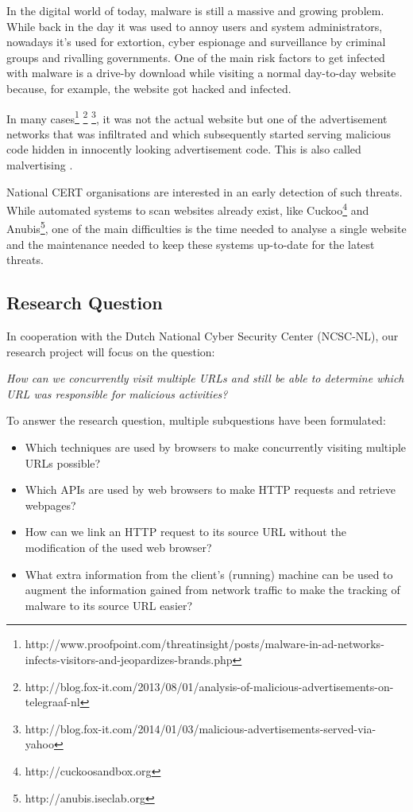 
In the digital world of today, malware is still a massive and growing problem. While back in the day it was used to annoy users and system administrators, nowadays it's used for extortion, cyber espionage and surveillance by criminal groups and rivalling governments. One of the main risk factors to get infected with malware is a drive-by download while visiting a normal day-to-day website because, for example, the website got hacked and infected. 

In many cases\footnote{http://www.proofpoint.com/threatinsight/posts/malware-in-ad-networks-infects-visitors-and-jeopardizes-brands.php} \footnote{http://blog.fox-it.com/2013/08/01/analysis-of-malicious-advertisements-on-telegraaf-nl} \footnote{http://blog.fox-it.com/2014/01/03/malicious-advertisements-served-via-yahoo}, it was not the actual website but one of the advertisement networks that was infiltrated and which subsequently started serving malicious code hidden in innocently looking advertisement code. This is also called malvertising \cite{Li2012}.

National CERT organisations are interested in an early detection of such threats. While automated systems to scan websites already exist, like Cuckoo\footnote{http://cuckoosandbox.org} and Anubis\footnote{http://anubis.iseclab.org}, one of the main difficulties is the time needed to analyse a single website and the maintenance needed to keep these systems up-to-date for the latest threats.



\subsection{Research Question}

In cooperation with the Dutch National Cyber Security Center (NCSC-NL), our research project will focus on the question:

\textit{How can we concurrently visit multiple URLs and still be able to determine which URL was responsible for malicious activities?}

To answer the research question, multiple subquestions have been formulated:

\begin{itemize}
\item Which techniques are used by browsers to make concurrently visiting multiple URLs possible?
\item Which APIs are used by web browsers to make HTTP requests and retrieve webpages?
\item How can we link an HTTP request to its source URL without the modification of the used web browser?
\item What extra information from the client's (running) machine can be used to augment the information gained from network traffic to make the tracking of malware to its source URL easier?
\end{itemize}

